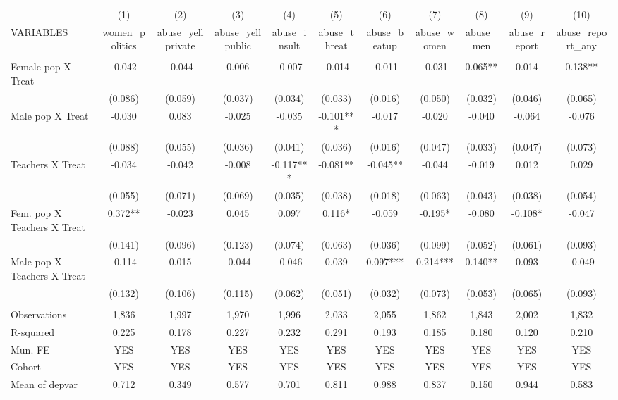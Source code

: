 \begin{tabular}{lcccccccccc} \hline
 & (1) & (2) & (3) & (4) & (5) & (6) & (7) & (8) & (9) & (10) \\
VARIABLES & women\_politics & abuse\_yellprivate & abuse\_yellpublic & abuse\_insult & abuse\_threat & abuse\_beatup & abuse\_women & abuse\_men & abuse\_report & abuse\_report\_any \\ \hline
 &  &  &  &  &  &  &  &  &  &  \\
Female pop X Treat & -0.042 & -0.044 & 0.006 & -0.007 & -0.014 & -0.011 & -0.031 & 0.065** & 0.014 & 0.138** \\
 & (0.086) & (0.059) & (0.037) & (0.034) & (0.033) & (0.016) & (0.050) & (0.032) & (0.046) & (0.065) \\
Male pop X Treat & -0.030 & 0.083 & -0.025 & -0.035 & -0.101*** & -0.017 & -0.020 & -0.040 & -0.064 & -0.076 \\
 & (0.088) & (0.055) & (0.036) & (0.041) & (0.036) & (0.016) & (0.047) & (0.033) & (0.047) & (0.073) \\
Teachers X Treat & -0.034 & -0.042 & -0.008 & -0.117*** & -0.081** & -0.045** & -0.044 & -0.019 & 0.012 & 0.029 \\
 & (0.055) & (0.071) & (0.069) & (0.035) & (0.038) & (0.018) & (0.063) & (0.043) & (0.038) & (0.054) \\
Fem. pop X Teachers X Treat & 0.372** & -0.023 & 0.045 & 0.097 & 0.116* & -0.059 & -0.195* & -0.080 & -0.108* & -0.047 \\
 & (0.141) & (0.096) & (0.123) & (0.074) & (0.063) & (0.036) & (0.099) & (0.052) & (0.061) & (0.093) \\
Male pop X Teachers X Treat & -0.114 & 0.015 & -0.044 & -0.046 & 0.039 & 0.097*** & 0.214*** & 0.140** & 0.093 & -0.049 \\
 & (0.132) & (0.106) & (0.115) & (0.062) & (0.051) & (0.032) & (0.073) & (0.053) & (0.065) & (0.093) \\
 &  &  &  &  &  &  &  &  &  &  \\
Observations & 1,836 & 1,997 & 1,970 & 1,996 & 2,033 & 2,055 & 1,862 & 1,843 & 2,002 & 1,832 \\
R-squared & 0.225 & 0.178 & 0.227 & 0.232 & 0.291 & 0.193 & 0.185 & 0.180 & 0.120 & 0.210 \\
Mun. FE & YES & YES & YES & YES & YES & YES & YES & YES & YES & YES \\
Cohort & YES & YES & YES & YES & YES & YES & YES & YES & YES & YES \\
 Mean of depvar & 0.712 & 0.349 & 0.577 & 0.701 & 0.811 & 0.988 & 0.837 & 0.150 & 0.944 & 0.583 \\ \hline
\end{tabular}
